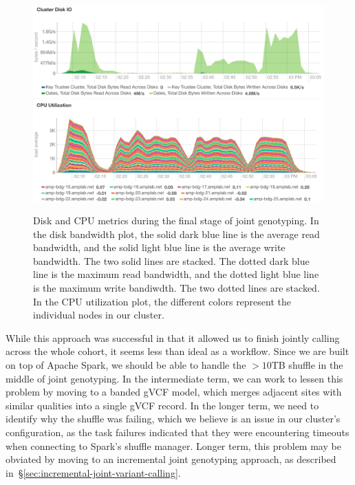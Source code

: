 \documentclass[phd]{ucbthesis}
\begin{document}
\begin{figure}[h]
  \begin{center}
    \includegraphics[width=0.95\linewidth]{graphs/jg-disk.png}
    \includegraphics[width=0.95\linewidth]{graphs/jg-cpu.png}
  \end{center}
  \caption{Disk and CPU metrics during the final stage of joint genotyping.
    In the disk bandwidth plot, the
    solid dark blue line is the average read bandwidth, and the solid light blue
    line is the average write bandwidth. The two solid lines are stacked. The
    dotted dark blue line is the maximum read bandwidth, and the dotted light
    blue line is the maximum write bandiwdth. The two dotted lines are stacked.
    In the CPU utilization plot, the different colors represent the individual
    nodes in our cluster.}
  \label{fig:final-joint-genotyping}
\end{figure}

While this approach was successful in that it allowed us to finish jointly
calling across the whole cohort, it seems less than ideal as a workflow. Since
we are built on top of Apache Spark, we should be able to handle the $>10$TB
shuffle in the middle of joint genotyping. In the intermediate term, we can work
to lessen this problem by moving to a banded gVCF model, which merges adjacent
sites with similar qualities into a single gVCF record. In the longer term, we
need to identify why the shuffle was failing, which we believe is an issue in
our cluster's configuration, as the task failures indicated that they were
encountering timeouts when connecting to Spark's shuffle manager. Longer term,
this problem may be obviated by moving to an incremental joint genotyping
approach, as described in~\S\ref{sec:incremental-joint-variant-calling}.
\end{document}
